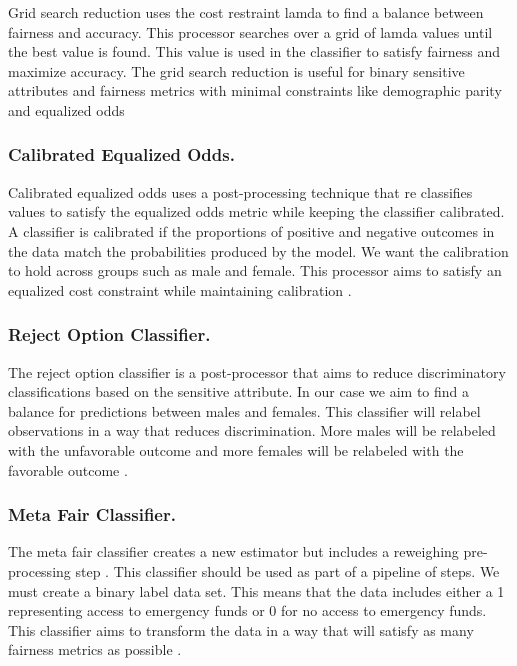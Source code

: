 \documentclass[water,article,submit,moreauthors,pdftex]{mdpi}
\begin{document}
Grid search reduction uses the cost restraint lamda to find a balance
between fairness and accuracy. This processor searches over a grid of
lamda values until the best value is found. This value is used in the
classifier to satisfy fairness and maximize accuracy. The grid search
reduction is useful for binary sensitive attributes and fairness metrics
with minimal constraints like demographic parity and equalized odds
\citep{agarwal2018reductions, agarwal2019fair}

\hypertarget{calibrated-equalized-odds.}{%
\subsubsection{Calibrated Equalized
Odds.}\label{calibrated-equalized-odds.}}

Calibrated equalized odds uses a post-processing technique that re
classifies values to satisfy the equalized odds metric while keeping the
classifier calibrated. A classifier is calibrated if the proportions of
positive and negative outcomes in the data match the probabilities
produced by the model. We want the calibration to hold across groups
such as male and female. This processor aims to satisfy an equalized
cost constraint while maintaining calibration
\citep{pleiss2017fairness}.

\hypertarget{reject-option-classifier.}{%
\subsubsection{Reject Option
Classifier.}\label{reject-option-classifier.}}

The reject option classifier is a post-processor that aims to reduce
discriminatory classifications based on the sensitive attribute. In our
case we aim to find a balance for predictions between males and females.
This classifier will relabel observations in a way that reduces
discrimination. More males will be relabeled with the unfavorable
outcome and more females will be relabeled with the favorable outcome
\citep{kamiran2012decision}.

\hypertarget{meta-fair-classifier.}{%
\subsubsection{Meta Fair Classifier.}\label{meta-fair-classifier.}}

The meta fair classifier creates a new estimator but includes a
reweighing pre-processing step \citep{celis2019classification}. This
classifier should be used as part of a pipeline of steps. We must create
a binary label data set. This means that the data includes either a 1
representing access to emergency funds or 0 for no access to emergency
funds. This classifier aims to transform the data in a way that will
satisfy as many fairness metrics as possible
\citep{agarwal2018reductions}.
\end{document}
